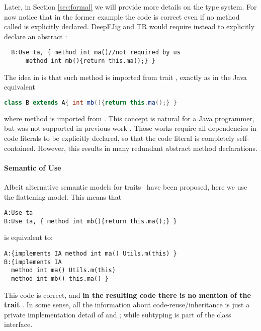 Later, in Section \ref{sec:formal} we will provide more details on the type
system. 
For now notice that in the former example the code is correct even if
no method called \Q@ma@ is explicitly declared.
DeepFJig and TR would require instead to explicitly declare an abstract \Q@ma@:
\saveSpace
\begin{lstlisting}
  B:Use ta, { method int ma()//not required by us
      method int mb(){return this.ma();} }
\end{lstlisting}\saveSpace
\noindent
The idea in \name is that such method is imported from trait \Q@ta@, exactly as in the Java equivalent
\saveSpace\begin{lstlisting}[language=Java]
  class B extends A{ int mb(){return this.ma();} }  
\end{lstlisting}
\saveSpace
where method \Q@ma@ is imported from \Q@A@.
This concept is natural for a Java programmer, but was not supported
in previous work \cite{BETTINI2013521,deep}. Those works require all
dependencies in code literals to be explicitly declared, so that the
code literal is completely self-contained. However, this results in
many redundant abstract method declarations.

\paragraph{Semantic of Use}
Albeit alternative semantic models for traits~\cite{Traits:ECOOP2003} have been proposed,
here we use the flattening model. This means that 
\saveSpace\begin{lstlisting}
A:Use ta
B:Use ta, { method int mb(){return this.ma();} }
\end{lstlisting}\saveSpace
 
\noindent is equivalent to:
  
\saveSpace \begin{lstlisting}
A:{implements IA method int ma() Utils.m(this) }
B:{implements IA
  method int ma() Utils.m(this)
  method int mb() this.ma() } 
 \end{lstlisting}
\saveSpace 
 This code is correct, and {\bf in the resulting code there is no mention of the trait
 \Q@ta@}. In some sense, all the information about code-reuse/inheritance
  is just a private implementation detail of \Q@A@
 and \Q@B@; while subtyping is part of the class interface.






